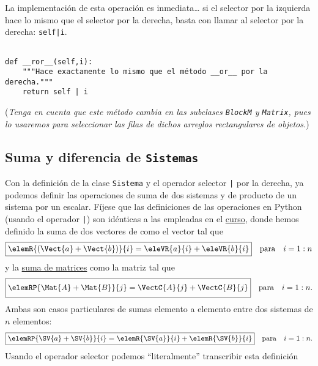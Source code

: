 \documentclass[11pt]{report}
\begin{document}
La implementación de esta operación es inmediata\dots{} si el selector
por la izquierda hace lo mismo que el selector por la derecha, basta
con llamar al selector por la derecha: \texttt{self|i}.

\begin{verbatim}

def __ror__(self,i):
    """Hace exactamente lo mismo que el método __or__ por la derecha."""
    return self | i

\end{verbatim}

(\emph{Tenga en cuenta que este método cambia en las subclases \texttt{BlockM} y \texttt{Matrix}, pues lo usaremos para seleccionar las filas de dichos arreglos rectangulares de objetos.})

\subsection{Suma y diferencia de \texttt{Sistemas}}
\label{sec:org6a14b5e}

Con la definición de la clase \texttt{Sistema} y el operador selector \texttt{|} por
la derecha, ya podemos definir las operaciones de suma de dos sistemas
y de producto de un sistema por un escalar. Fíjese que las
definiciones de las operaciones en Python (usando el operador \texttt{|}) son
idénticas a las empleadas en el \href{https://mbujosab.github.io/CursoDeAlgebraLineal/libro.pdf\#section.1.2}{curso}, donde hemos definido la suma de
dos vectores de \R[n] como el vector tal que
\begin{displaymath}
  \fbox{\begin{math} \elemR{(\Vect{a}+\Vect{b})}{i}=\eleVR{a}{i}+\eleVR{b}{i} \end{math}}
  \quad\text{para}\quad i=1:n
\end{displaymath}
y la \href{https://mbujosab.github.io/CursoDeAlgebraLineal/libro.pdf\#section.1.5}{suma de matrices} como la matriz tal que
\begin{displaymath}
  \fbox{\begin{math} \elemRP{\Mat{A}+\Mat{B}}{j}=\VectC{A}{j}+\VectC{B}{j} \vphantom{\Big(} \end{math}}
  \quad\text{para}\quad i=1:n.
\end{displaymath}
Ambas son casos particulares de sumas elemento a elemento entre dos sistemas de \(n\) elementos:
\begin{displaymath}
  \fbox{\begin{math} \elemRP{\SV{a}+\SV{b}}{i}=\elemR{\SV{a}}{i}+\elemR{\SV{b}}{i} \end{math}}
  \quad\text{para}\quad i=1:n.
\end{displaymath}
Usando el operador selector podemos ``literalmente'' transcribir esta definición
\end{document}
